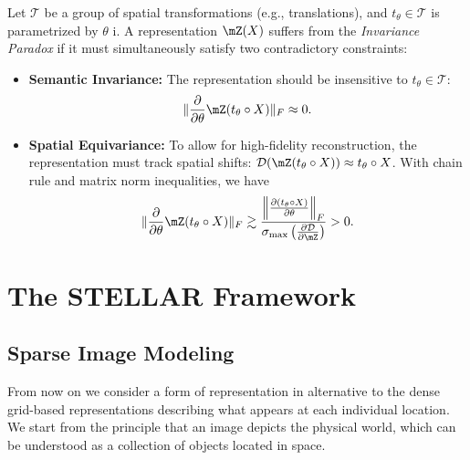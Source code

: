 Let $\mathcal{T}$ be a group of spatial transformations (e.g., translations), and $t_\theta \in \mathcal{T}$ is parametrized by $\theta$ i. A representation $\mZ (X)$ suffers from the \textit{Invariance Paradox} if it must simultaneously satisfy two contradictory constraints: 
\begin{itemize}
    \item \textbf{Semantic Invariance:} The representation should be insensitive to $t_\theta \in \mathcal{T}$: 
    \[
    \|\frac{\partial}{\partial \theta} \mZ (t_\theta \circ X)\|_F \approx 0.
    \]
    \item \textbf{Spatial Equivariance:} To allow for high-fidelity reconstruction, the representation must track spatial shifts: $\mathcal{D}(\mZ (t_\theta \circ X)) \approx t_\theta \circ X$. With chain rule and matrix norm inequalities, we have
    \[
    \|\frac{\partial}{\partial \theta}\mZ (t_\theta \circ X)\|_F \gtrsim \frac{\left\| \frac{\partial (t_\theta \circ X)}{\partial \theta} \right\|_F}{\sigma_{\max} \left( \frac{\partial \mathcal{D}}{\partial \mZ } \right)} > 0.
    \]
\end{itemize}











\section{The STELLAR Framework}
\subsection{Sparse Image Modeling}


From now on we consider a form of representation in alternative to the dense grid-based representations describing what appears at each individual location. We start from the principle that an image depicts the physical world, which can be understood as a collection of objects located in space. 

